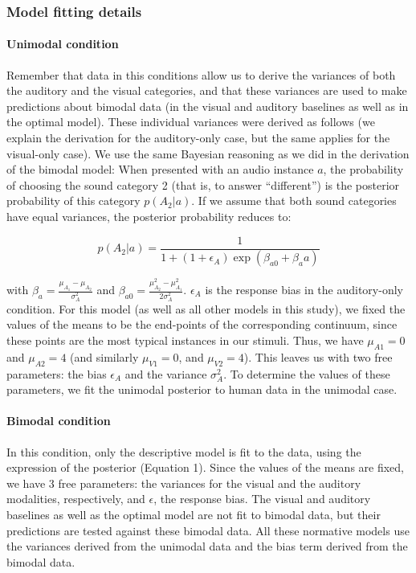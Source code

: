 \documentclass[english,man]{apa6}
\theoremstyle{definition}
\theoremstyle{definition}
\theoremstyle{definition}
\theoremstyle{remark}
\begin{document}
\subsubsection{Model fitting details}\label{model-fitting-details}

\paragraph{Unimodal condition}\label{unimodal-condition}

Remember that data in this conditions allow us to derive the variances
of both the auditory and the visual categories, and that these variances
are used to make predictions about bimodal data (in the visual and
auditory baselines as well as in the optimal model). These individual
variances were derived as follows (we explain the derivation for the
auditory-only case, but the same applies for the visual-only case). We
use the same Bayesian reasoning as we did in the derivation of the
bimodal model: When presented with an audio instance \(a\), the
probability of choosing the sound category 2 (that is, to answer
\enquote{different}) is the posterior probability of this category
\(p(A_2|a)\). If we assume that both sound categories have equal
variances, the posterior probability reduces to:

\[p(A_2 | a)=\frac{1}{1+(1+\epsilon_A)\exp(\beta_{a0}+\beta_aa)}\]

with \(\beta_a=\frac{\mu_{A_1}-\mu_{A_2}}{\sigma^2_{A}}\) and
\(\beta_{a0}=\frac{\mu^2_{A_2}-\mu^2_{A_1}}{2\sigma^2_{A}}\).
\(\epsilon_A\) is the response bias in the auditory-only condition. For
this model (as well as all other models in this study), we fixed the
values of the means to be the end-points of the corresponding continuum,
since these points are the most typical instances in our stimuli. Thus,
we have \(\mu_{A1}=0\) and \(\mu_{A2}=4\) (and similarly \(\mu_{V1}=0\),
and \(\mu_{V2}=4\)). This leaves us with two free parameters: the bias
\(\epsilon_A\) and the variance \(\sigma^2_{A}\). To determine the
values of these parameters, we fit the unimodal posterior to human data
in the unimodal case.

\paragraph{Bimodal condition}\label{bimodal-condition}

In this condition, only the descriptive model is fit to the data, using
the expression of the posterior (Equation 1). Since the values of the
means are fixed, we have 3 free parameters: the variances for the visual
and the auditory modalities, respectively, and \(\epsilon\), the
response bias. The visual and auditory baselines as well as the optimal
model are not fit to bimodal data, but their predictions are tested
against these bimodal data. All these normative models use the variances
derived from the unimodal data and the bias term derived from the
bimodal data.
\end{document}
